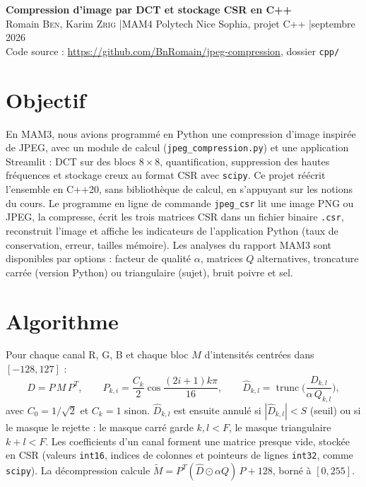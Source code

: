 \documentclass[10pt,a4paper]{article}
\newcommand{\code}[1]{\texttt{#1}}
\begin{document}
\begin{center}
  {\Large\bfseries\color{accent} Compression d'image par DCT et stockage CSR en C++}\\[3pt]
  Romain \textsc{Ben}, Karim \textsc{Zrig} \quad|\quad MAM4 Polytech Nice Sophia, projet C++ \quad|\quad septembre 2026\\[1pt]
  {\small Code source : \url{https://github.com/BnRomain/jpeg-compression}, dossier \code{cpp/}}
\end{center}

\section{Objectif}
En MAM3, nous avions programmé en Python une compression d'image inspirée de JPEG,
avec un module de calcul (\code{jpeg\_compression.py}) et une application Streamlit :
DCT sur des blocs $8\times8$, quantification, suppression des hautes fréquences et
stockage creux au format CSR avec \code{scipy}. Ce projet réécrit l'ensemble en
C++20, sans bibliothèque de calcul, en s'appuyant sur les notions du cours. Le
programme en ligne de commande \code{jpeg\_csr} lit une image PNG ou JPEG, la
compresse, écrit les trois matrices CSR dans un fichier binaire \code{.csr},
reconstruit l'image et affiche les indicateurs de l'application Python (taux de
conservation, erreur, tailles mémoire). Les analyses du rapport MAM3 sont disponibles
par options : facteur de qualité $\alpha$, matrices $Q$ alternatives, troncature
carrée (version Python) ou triangulaire (sujet), bruit poivre et sel.

\section{Algorithme}
Pour chaque canal R, G, B et chaque bloc $M$ d'intensités centrées dans $[-128,127]$ :
\[
  D = P\,M\,P^{T}, \qquad P_{k,i} = \frac{C_k}{2}\cos\frac{(2i+1)k\pi}{16}, \qquad
  \hat D_{k,l} = \operatorname{trunc}\!\Big(\frac{D_{k,l}}{\alpha\,Q_{k,l}}\Big),
\]
avec $C_0 = 1/\sqrt{2}$ et $C_k = 1$ sinon. $\hat D_{k,l}$ est ensuite annulé si
$|\hat D_{k,l}| < S$ (seuil) ou si le masque le rejette : le masque carré garde
$k,l < F$, le masque triangulaire $k+l < F$. Les coefficients d'un canal forment une
matrice presque vide, stockée en CSR (valeurs \code{int16}, indices de colonnes et
pointeurs de lignes \code{int32}, comme \code{scipy}). La décompression calcule
$\tilde M = P^{T}(\hat D \odot \alpha Q)\,P + 128$, borné à $[0,255]$.
\end{document}
